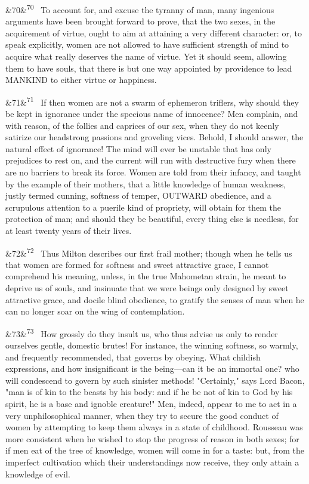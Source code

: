 \documentclass[12pt]{article}
\newcommand{\para}[1][]{\par\noindent\ifx&#1&\else\textsuperscript{\footnotesize #1}~\fi}
\begin{document}
\para[70] To account for, and excuse the tyranny of man, many ingenious arguments have been brought forward to prove, that the two sexes, in the acquirement of virtue, ought to aim at attaining a very different character: or, to speak explicitly, women are not allowed to have sufficient strength of mind to acquire what really deserves the name of virtue. Yet it should seem, allowing them to have souls, that there is but one way appointed by providence to lead MANKIND to either virtue or happiness.

\para[71] If then women are not a swarm of ephemeron triflers, why should they be kept in ignorance under the specious name of innocence? Men complain, and with reason, of the follies and caprices of our sex, when they do not keenly satirize our headstrong passions and groveling vices. Behold, I should answer, the natural effect of ignorance! The mind will ever be unstable that has only prejudices to rest on, and the current will run with destructive fury when there are no barriers to break its force. Women are told from their infancy, and taught by the example of their mothers, that a little knowledge of human weakness, justly termed cunning, softness of temper, OUTWARD obedience, and a scrupulous attention to a puerile kind of propriety, will obtain for them the protection of man; and should they be beautiful, every thing else is needless, for at least twenty years of their lives.

\para[72] Thus Milton describes our first frail mother; though when he tells us that women are formed for softness and sweet attractive grace, I cannot comprehend his meaning, unless, in the true Mahometan strain, he meant to deprive us of souls, and insinuate that we were beings only designed by sweet attractive grace, and docile blind obedience, to gratify the senses of man when he can no longer soar on the wing of contemplation.

\para[73] How grossly do they insult us, who thus advise us only to render ourselves gentle, domestic brutes! For instance, the winning softness, so warmly, and frequently recommended, that governs by obeying. What childish expressions, and how insignificant is the being---can it be an immortal one? who will condescend to govern by such sinister methods! "Certainly," says Lord Bacon, "man is of kin to the beasts by his body: and if he be not of kin to God by his spirit, he is a base and ignoble creature!" Men, indeed, appear to me to act in a very unphilosophical manner, when they try to secure the good conduct of women by attempting to keep them always in a state of childhood. Rousseau was more consistent when he wished to stop the progress of reason in both sexes; for if men eat of the tree of knowledge, women will come in for a taste: but, from the imperfect cultivation which their understandings now receive, they only attain a knowledge of evil.
\end{document}
